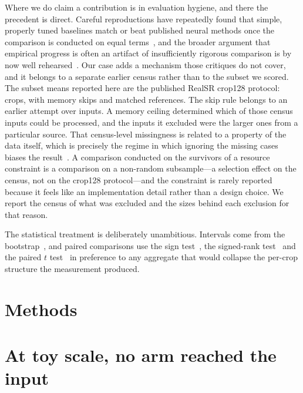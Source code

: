 Where we do claim a contribution is in evaluation hygiene, and there the
precedent is direct. Careful reproductions have repeatedly found that simple,
properly tuned baselines match or beat published neural methods once the
comparison is conducted on equal terms~\cite{dacrema2019worrying}, and the
broader argument that empirical progress is often an artifact of insufficiently
rigorous comparison is by now well
rehearsed~\cite{sculley2018winners,lin2019neural,ioannidis2005why,
simmons2011false,button2013power,cohen1992power,head2015phacking,
amrhein2019retire}. Our case adds a mechanism those critiques do not cover, and
it belongs to a separate earlier census rather than to the subset we scored.
The subset means reported here are the published RealSR crop128 protocol:
\SubsetN{} crops, with \EvalSkipped{} memory skips and \EvalReferences{} matched
references. The skip rule belongs to an earlier attempt over \CensusTotal{}
inputs. A memory ceiling determined which of those census inputs could be
processed, and the inputs it excluded were the larger ones from a particular
source. That census-level missingness is related to a property of the data
itself, which is precisely the regime in which ignoring the missing cases
biases the result~\cite{rubin1976inference}. A comparison conducted on the
survivors of a resource constraint is a comparison on a non-random
subsample---a selection effect on the census, not on the crop128
protocol---and the constraint is rarely reported because it feels like an
implementation detail rather than a design choice. We report the census of
what was excluded and the sizes behind each exclusion for that reason.

The statistical treatment is deliberately unambitious. Intervals come from the
bootstrap~\cite{efron1979bootstrap}, and paired comparisons use the sign
test~\cite{dixon1946sign}, the signed-rank test~\cite{wilcoxon1945individual}
and the paired $t$ test~\cite{student1908probable} in preference to any
aggregate that would collapse the per-crop structure the measurement produced.

\section{Methods}


\section{At toy scale, no arm reached the input}

